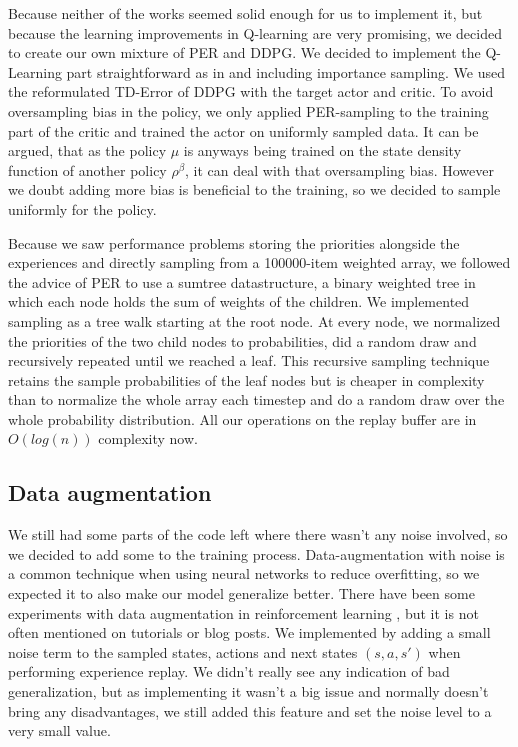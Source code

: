 \documentclass[hyperref,beleg]{cgvpub}
\begin{document}
Because neither of the works seemed solid enough for us to implement it, but because the learning improvements in Q-learning are very promising, we decided to create our own mixture of \ac{PER} and \ac{DDPG}. We decided to implement the Q-Learning part straightforward as in \cite{schaulPrioritizedExperienceReplay2016} and including importance sampling. We used the reformulated \ac{TD-Error} of \ac{DDPG} with the target actor and critic. To avoid oversampling bias in the policy, we only applied \ac{PER}-sampling to the training part of the critic and trained the actor on uniformly sampled data. It can be argued, that as the policy $\mu$ is anyways being trained on the state density function of another policy $\rho^{\beta}$, it can deal with that oversampling bias. However we doubt adding more bias is beneficial to the training, so we decided to sample uniformly for the policy.

Because we saw performance problems storing the priorities alongside the experiences and directly sampling from a 100000-item weighted array, we followed the advice of \ac{PER} to use a sumtree datastructure, a binary weighted tree in which each node holds the sum of weights of the children. We implemented sampling as a tree walk starting at the root node. At every node, we normalized the priorities of the two child nodes to probabilities, did a random draw and recursively repeated until we reached a leaf. This recursive sampling technique retains the sample probabilities of the leaf nodes but is cheaper in complexity than to normalize the whole array each timestep and do a random draw over the whole probability distribution. All our operations on the replay buffer are in $O(log(n))$ complexity now.

\subsection{Data augmentation}

We still had some parts of the code left where there wasn't any noise involved, so we decided to add some to the training process. Data-augmentation with noise is a common technique when using neural networks \cite[p.347]{bishopNeuralNetworksPattern1995} to reduce overfitting, so we expected it to also make our model generalize better. There have been some experiments with data augmentation in reinforcement learning \cite{cobbeQuantifyingGeneralizationReinforcement2019}, but it is not often mentioned on tutorials or blog posts. We implemented by adding a small noise term to the sampled states, actions and next states \((s, a, s')\) when performing experience replay. We didn't really see any indication of bad generalization, but as implementing it wasn't a big issue and normally doesn't bring any disadvantages, we still added this feature and set the noise level to a very small value.
\end{document}
